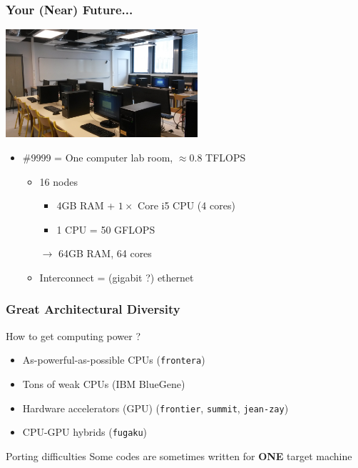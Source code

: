 \documentclass[xcolor={x11names,svgnames,psnames}]{beamer}
\begin{document}
\begin{frame}
  \frametitle{Your (Near) Future...}

  \begin{center}
    \includegraphics[height=4cm]{ppti}
  \end{center}
  
  \begin{itemize}
  \item \#9999 = One computer lab room, $\approx 0.8$ TFLOPS
    \begin{itemize}
    \item 16 nodes
      \begin{itemize}
      \item 4GB RAM + $1 \times$ Core i5 CPU (4 cores)
      \item 1 CPU = 50 GFLOPS
      \end{itemize}
    \item[$\rightarrow$] 64GB RAM, 64 cores
    \item Interconnect = (gigabit ?) ethernet
    \end{itemize}
  \end{itemize}

\end{frame}


\begin{frame}
  \frametitle{Great Architectural Diversity}

  \begin{block}{How to get computing power ?}
    \begin{itemize}
    \item As-powerful-as-possible CPUs (\texttt{frontera})
    \item Tons of weak CPUs (IBM BlueGene)
    \item Hardware accelerators (GPU) (\texttt{frontier}, \texttt{summit}, \texttt{jean-zay})
    \item CPU-GPU hybrids (\texttt{fugaku})
    \end{itemize}
  \end{block}

  \bigskip

  \begin{alertblock}{Porting difficulties}
    Some codes are sometimes written for \textbf{ONE} target machine
  \end{alertblock}  
\end{frame}
\end{document}
